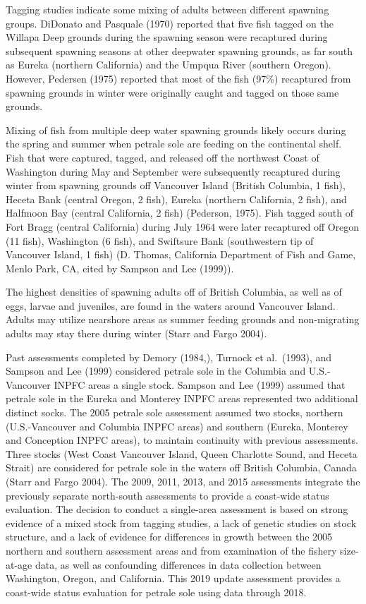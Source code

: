 \documentclass[11pt,
  english,
  letterpaper,
]{article}
\begin{document}
Tagging studies indicate some mixing of adults between different spawning groups. DiDonato and Pasquale (1970) reported that five fish tagged on the Willapa Deep grounds during the spawning season were recaptured during subsequent spawning seasons at other deepwater spawning grounds, as far south as Eureka (northern California) and the Umpqua River (southern Oregon). However, Pedersen (1975) reported that most of the fish (97\%) recaptured from spawning grounds in winter were originally caught and tagged on those same grounds.

Mixing of fish from multiple deep water spawning grounds likely occurs during the spring and summer when petrale sole are feeding on the continental shelf. Fish that were captured, tagged, and released off the northwest Coast of Washington during May and September were subsequently recaptured during winter from spawning grounds off Vancouver Island (British Columbia, 1 fish), Heceta Bank (central Oregon, 2 fish), Eureka (northern California, 2 fish), and Halfmoon Bay (central California, 2 fish) (Pederson, 1975). Fish tagged south of Fort Bragg (central California) during July 1964 were later recaptured off Oregon (11 fish), Washington (6 fish), and Swiftsure Bank (southwestern tip of Vancouver Island, 1 fish) (D. Thomas, California Department of Fish and Game, Menlo Park, CA, cited by Sampson and Lee (1999)).

The highest densities of spawning adults off of British Columbia, as well as of eggs, larvae and juveniles, are found in the waters around Vancouver Island. Adults may utilize nearshore areas as summer feeding grounds and non-migrating adults may stay there during winter (Starr and Fargo 2004).

Past assessments completed by Demory (1984,), Turnock et al.~(1993), and Sampson and Lee (1999) considered petrale sole in the Columbia and U.S.-Vancouver INPFC areas a single stock. Sampson and Lee (1999) assumed that petrale sole in the Eureka and Monterey INPFC areas represented two additional distinct socks. The 2005 petrale sole assessment assumed two stocks, northern (U.S.-Vancouver and Columbia INPFC areas) and southern (Eureka, Monterey and Conception INPFC areas), to maintain continuity with previous assessments. Three stocks (West Coast Vancouver Island, Queen Charlotte Sound, and Heceta Strait) are considered for petrale sole in the waters off British Columbia, Canada (Starr and Fargo 2004). The 2009, 2011, 2013, and 2015 assessments integrate the previously separate north-south assessments to provide a coast-wide status evaluation. The decision to conduct a single-area assessment is based on strong evidence of a mixed stock from tagging studies, a lack of genetic studies on stock structure, and a lack of evidence for differences in growth between the 2005 northern and southern assessment areas and from examination of the fishery size-at-age data, as well as confounding differences in data collection between Washington, Oregon, and California. This 2019 update assessment provides a coast-wide status evaluation for petrale sole using data through 2018.
\end{document}
